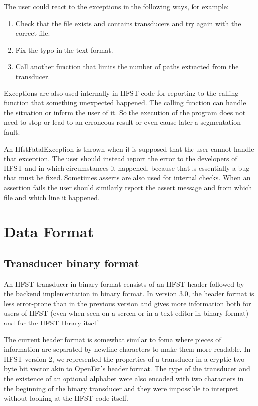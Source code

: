 \documentclass{llncs}
\begin{document}
The user could react to the exceptions in the following ways, for
example:

\begin{enumerate} 
\item Check that the file exists and contains transducers and try again
with the correct file.
\item Fix the typo in the text format.
\item Call another function that limits the number of paths extracted
from the transducer.
\end{enumerate} 

Exceptions are also used internally in HFST code for reporting to the 
calling function that something unexpected happened. The calling
function can handle the situation or inform the user of it. 
So the execution of the program does not need to stop or lead to an
erroneous result or even cause later a segmentation fault.

An HfstFatalException is thrown when it is supposed that the user
cannot handle that exception. The user should instead report the error
to the developers of HFST and in which circumstances it happened, because that
is essentially a bug that must be fixed. Sometimes asserts are also
used for internal checks. When an assertion fails the user should similarly
report the assert message and from which file and which line it happened.


\section{Data Format}

\subsection{Transducer binary format}

An HFST transducer in binary format consists of an HFST header followed by the
backend implementation in binary format. In version 3.0, the header
format is less error-prone than in the previous version and gives more 
information both for users of HFST (even when seen on a screen or in a
text editor in binary format) and for the HFST library itself.
 
The current header format is somewhat similar to foma where pieces of 
information are separated by newline characters to make them more
readable. In HFST version 2, we represented the properties of a
transducer in a cryptic two-byte bit vector akin to OpenFst's header
format. The type of the transducer and the existence of an optional
alphabet were also encoded with two characters in the beginning of the
binary transducer and they were impossible to interpret without
looking at the HFST code itself.
\end{document}
